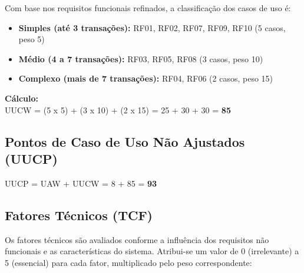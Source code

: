Com base nos requisitos funcionais refinados, a classificação dos casos de uso é:
\begin{itemize}
    \item \textbf{Simples (até 3 transações):} RF01, RF02, RF07, RF09, RF10 (5 casos, peso 5)
    \item \textbf{Médio (4 a 7 transações):} RF03, RF05, RF08 (3 casos, peso 10)
    \item \textbf{Complexo (mais de 7 transações):} RF04, RF06 (2 casos, peso 15)
\end{itemize}

\textbf{Cálculo:}
\\
UUCW = (5 x 5) + (3 x 10) + (2 x 15) = 25 + 30 + 30 = \textbf{85}

\subsection{Pontos de Caso de Uso Não Ajustados (UUCP)}

UUCP = UAW + UUCW = 8 + 85 = \textbf{93}

\subsection{Fatores Técnicos (TCF)}

Os fatores técnicos são avaliados conforme a influência dos requisitos não funcionais e as características do sistema. Atribui-se um valor de 0 (irrelevante) a 5 (essencial) para cada fator, multiplicado pelo peso correspondente:

